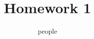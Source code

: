\documentclass[handout]{ximera}
\title{Homework 1}
\author{people}
\begin{document}
\maketitle
\renewcommand{\QuestionSelect}[5]{%


\set@RelaxActiveTags{}
\set@StrictActiveTags{}

\ifthenelse{\isempty{#1}}
	{
	\expandafter\addTo@RelaxActiveTags\TagList@MasterCatOne
	}
	{
	\addTo@RelaxActiveTags{#1}
	}

\ifthenelse{\isempty{#2}}
	{
	\expandafter\addTo@RelaxActiveTags\TagList@MasterCatTwo
	}
	{
	\addTo@RelaxActiveTags{#2}
	}

\ifthenelse{\isempty{#3}}
	{
	\expandafter\addTo@RelaxActiveTags\TagList@MasterCatThree
	}
	{
	\addTo@RelaxActiveTags{#3}
	}

\ifthenelse{\isempty{#4}}
	{
	\expandafter\addTo@RelaxActiveTags\TagList@MasterCatFour
	}
	{
	\addTo@StrictActiveTags{#4}
	}

	\Master@Input@Test

\setcounter{Problem@MasterCounter}{\arabic{Total@Question}}


\ifVerbose{ The Problem@MasterCounter Value is: \arabic{Problem@MasterCounter}}\fi

\Question@Quantity{#5}	%


\Q@Selection{50}	%

\questionListtrue

\Master@Input@Test


\setcounter{Total@Question}{0}
\ifVerbose{The Value of Total@Question Counter is \arabic{Total@Question}}\fi
\setcounter{Real@PullNumber}{0}
\questionListfalse
}
\end{document}
